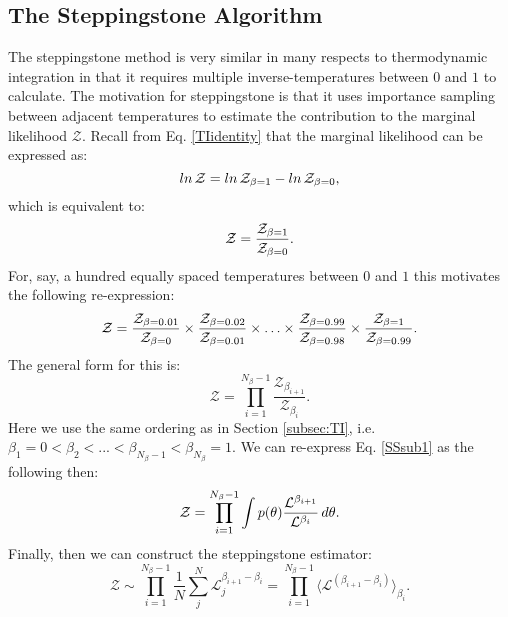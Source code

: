 \subsection{The Steppingstone Algorithm}

The steppingstone method is very similar in many respects to thermodynamic integration in that it requires multiple inverse-temperatures between $0$ and $1$ to calculate. The motivation for steppingstone is that it uses importance sampling between adjacent temperatures to estimate the contribution to the marginal likelihood $\mathcal{Z}$. Recall from Eq. \ref{TIidentity} that the marginal likelihood can be expressed as:
\begin{equation}\notag
    ln \, \mathcal{Z} = ln \, \mathcal{Z}_{\beta=1} - ln \, \mathcal{Z}_{\beta=0},
\end{equation}
which is equivalent to:
\begin{equation}\notag
    \mathcal{Z} = \frac{\mathcal{Z}_{\beta=1}}{\mathcal{Z}_{\beta=0}}.
\end{equation}
For, say, a hundred equally spaced temperatures between $0$ and $1$ this motivates the following re-expression:
\begin{equation}\notag
    \mathcal{Z} = \frac{\mathcal{Z}_{\beta = 0.01}} {\mathcal{Z}_{\beta = 0}}  
    \times \frac{\mathcal{Z}_{\beta = 0.02}} {\mathcal{Z}_{\beta = 0.01}}
    \times \ldots \times \frac{\mathcal{Z}_{\beta = 0.99}} {\mathcal{Z}_{\beta = 0.98}} \times \frac{\mathcal{Z}_{\beta = 1}} {\mathcal{Z}_{\beta = 0.99}}.
\end{equation}
The general form for this is:
\begin{equation}\label{SSsub1}
     \mathcal{Z} = \prod_{i=1}^{N_\beta -1} \frac{\mathcal{Z}_{\beta_{i+1}}}{\mathcal{Z}_{\beta_{i}}}.
\end{equation}
Here we use the same ordering as in Section \ref{subsec:TI}, i.e. $\beta_1=0 < \beta_2 < ... < \beta_{N_\beta -1} < \beta_{N_\beta} = 1$. We can re-express Eq. \ref{SSsub1} as the following then:
\begin{equation}\notag
     \mathcal{Z} = \prod_{i=1}^{N_\beta -1} \int p(\theta) \frac{ \mathcal{L}^{\beta_{i+1}}}{\mathcal{L}^{\beta_{i}}} \, d\theta.
\end{equation}
Finally, then we can construct the steppingstone estimator:
\begin{equation}\label{SSeq1}
    \mathcal{Z} \sim \prod_{i=1}^{N_\beta -1} \frac{1}{N} \sum_j^N \mathcal{L}_j^{\beta_{i+1} - \beta_{i}} = \prod_{i=1}^{N_\beta -1} \langle \mathcal{L}^{\left(\beta_{i+1} - \beta_{i}\right)}\rangle_{\beta_i}.
\end{equation}
